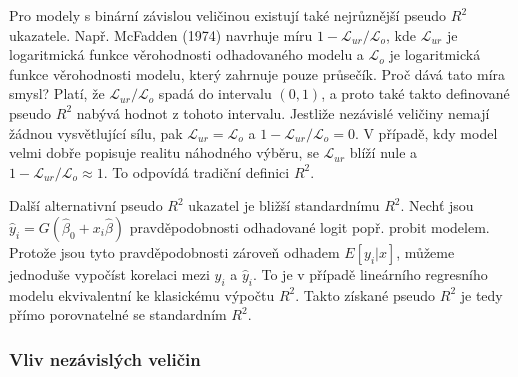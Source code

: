 Pro modely s binární závislou veličinou existují také nejrůznější pseudo $R^2$ ukazatele. Např. McFadden (1974) navrhuje míru $1 - \mathscr{L}_{ur} / \mathscr{L}_o$, kde $\mathscr{L}_{ur}$ je logaritmická funkce věrohodnosti odhadovaného modelu a $\mathscr{L}_o$ je logaritmická funkce věrohodnosti modelu, který zahrnuje pouze průsečík. Proč dává tato míra smysl? Platí, že $\mathscr{L}_{ur} / \mathscr{L}_o$ spadá do intervalu $(0, 1)$, a proto také takto definované pseudo $R^2$ nabývá hodnot z tohoto intervalu. Jestliže nezávislé veličiny nemají žádnou vysvětlující sílu, pak $\mathscr{L}_{ur} = \mathscr{L}_o$ a $1 - \mathscr{L}_{ur} / \mathscr{L}_o = 0$. V případě, kdy model velmi dobře popisuje realitu náhodného výběru, se $\mathscr{L}_{ur}$ blíží nule a $1 - \mathscr{L}_{ur} / \mathscr{L}_o \approx 1$. To odpovídá tradiční definici $R^2$.

Další alternativní pseudo $R^2$ ukazatel je bližší standardnímu $R^2$. Nechť jsou $\hat{y}_i = G(\hat{\beta}_0 + x_i \hat{\beta})$ pravděpodobnosti odhadované logit popř. probit modelem. Protože jsou tyto pravděpodobnosti zároveň odhadem $E[y_i | x]$, můžeme jednoduše vypočíst korelaci mezi $y_i$ a $\hat{y}_i$. To je v případě lineárního regresního modelu ekvivalentní ke klasickému výpočtu $R^2$. Takto získané pseudo $R^2$ je tedy přímo porovnatelné se standardním $R^2$.

\subsubsection{Vliv nezávislých veličin}

